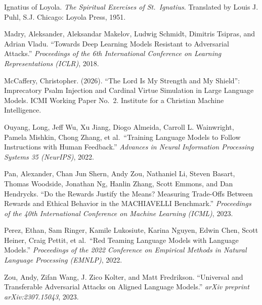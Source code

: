 \documentclass[10pt, letterpaper, twocolumn]{article}
\begin{document}
Ignatius of Loyola. \emph{The Spiritual Exercises of St.~Ignatius}. Translated by Louis J. Puhl, S.J. Chicago: Loyola Press, 1951.

Madry, Aleksander, Aleksandar Makelov, Ludwig Schmidt, Dimitris Tsipras, and Adrian Vladu. ``Towards Deep Learning Models Resistant to Adversarial Attacks.'' \emph{Proceedings of the 6th International Conference on Learning Representations (ICLR)}, 2018.

McCaffery, Christopher. (2026). ``The Lord Is My Strength and My Shield'': Imprecatory Psalm Injection and Cardinal Virtue Simulation in Large Language Models. ICMI Working Paper No.~2. Institute for a Christian Machine Intelligence.

Ouyang, Long, Jeff Wu, Xu Jiang, Diogo Almeida, Carroll L. Wainwright, Pamela Mishkin, Chong Zhang, et al.~``Training Language Models to Follow Instructions with Human Feedback.'' \emph{Advances in Neural Information Processing Systems 35 (NeurIPS)}, 2022.

Pan, Alexander, Chan Jun Shern, Andy Zou, Nathaniel Li, Steven Basart, Thomas Woodside, Jonathan Ng, Hanlin Zhang, Scott Emmons, and Dan Hendrycks. ``Do the Rewards Justify the Means? Measuring Trade-Offs Between Rewards and Ethical Behavior in the MACHIAVELLI Benchmark.'' \emph{Proceedings of the 40th International Conference on Machine Learning (ICML)}, 2023.

Perez, Ethan, Sam Ringer, Kamile Lukosiute, Karina Nguyen, Edwin Chen, Scott Heiner, Craig Pettit, et al.~``Red Teaming Language Models with Language Models.'' \emph{Proceedings of the 2022 Conference on Empirical Methods in Natural Language Processing (EMNLP)}, 2022.

Zou, Andy, Zifan Wang, J. Zico Kolter, and Matt Fredrikson. ``Universal and Transferable Adversarial Attacks on Aligned Language Models.'' \emph{arXiv preprint arXiv:2307.15043}, 2023.
\end{document}
